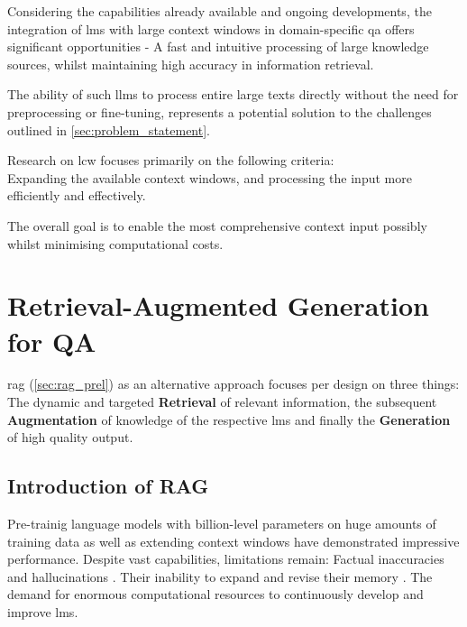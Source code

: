 %
Considering the capabilities already available and ongoing developments, the integration of \acp{lm} with large context windows in domain-specific \ac{qa} offers significant opportunities - A fast and intuitive processing of large knowledge sources, whilst maintaining high accuracy in information retrieval.

The ability of such \acp{llm} to process entire large texts directly without the need for preprocessing or fine-tuning, represents a potential solution to the challenges outlined in \cref{sec:problem_statement}.
%

Research on \ac{lcw} focuses primarily on the following criteria:\\
Expanding the available context windows, and processing the input more efficiently and effectively.

The overall goal is to enable the most comprehensive context input possibly whilst minimising computational costs.

\section{Retrieval-Augmented Generation for QA}\label{sec:rag_for_qa}

\ac{rag} (\cref{sec:rag_prel}) as an alternative approach focuses per design on three things:\\
The dynamic and targeted \textbf{Retrieval} of relevant information, the subsequent \textbf{Augmentation} of knowledge of the respective \acp{lm} and finally the \textbf{Generation} of high quality output.
%
\subsection{Introduction of RAG}
Pre-trainig language models with billion-level parameters on huge amounts of training data as well as extending context windows have demonstrated impressive performance.
Despite vast capabilities, limitations remain: Factual inaccuracies \citep{augenstein2023factualitychallengeseralarge} and hallucinations \citep{fan2024surveyragmeetingllms}.
Their inability to expand and revise their memory \citep{lewis2020ragnlp}.
The demand for enormous computational resources to continuously develop and improve \acp{lm}.
%

